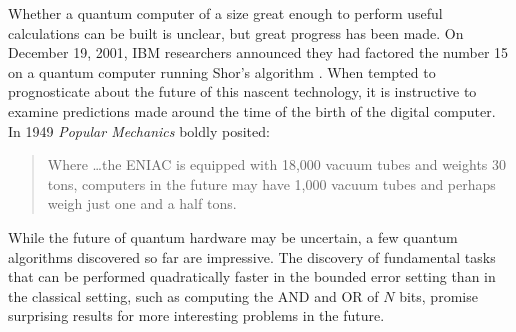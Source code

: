 Whether a quantum computer of a size great enough to perform useful
calculations can be built is unclear, but great progress has been
made.  On December 19, 2001, IBM researchers announced they had
factored the number 15 on a quantum computer running Shor's algorithm
\cite{ibm01shor}.  When tempted to prognosticate about the future of
this nascent technology, it is instructive to examine predictions made
around the time of the birth of the digital computer.  In 1949
\emph{Popular Mechanics} boldly posited:
\begin{quote}
Where \ldots the ENIAC is equipped with 18,000 vacuum tubes and
weights 30 tons, computers in the future may have 1,000 vacuum tubes
and perhaps weigh just one and a half tons\cite {patterson98computer}.
\end{quote}
While the future of quantum hardware may be uncertain, a few quantum
algorithms discovered so far are impressive.  The discovery of
fundamental tasks that can be performed quadratically faster in the
bounded error setting than in the classical setting, such as computing
the AND and OR of $N$ bits, promise surprising results for more
interesting problems in the future.

